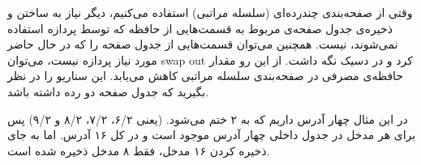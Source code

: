 وقتی از صفحه‌بندی چندرده‌ای (سلسله مراتبی) استفاده می‌کنیم، دیگر نیاز به ساختن و ذخیره‌ی جدول صفحه‌ی مربوط به قسمت‌هایی از حافظه که توسط پردازه استفاده نمی‌شوند، نیست. همچنین می‌توان قسمت‌هایی از جدول صفحه را که در حال حاضر مورد نیاز پردازه نیست، می‌توان swap out کرد و در دسیک نگه داشت. از این رو مقدار حافظه‌ی مصرفی در صفحه‌بندی سلسله مراتبی کاهش می‌یابد.
این سناریو را در نظر بگیرید که جدول صفحه دو رده داشته باشد. 
\begin{latin}
	
\end{latin}

در این مثال چهار آدرس داریم که به ۲ ختم می‌شود. (یعنی ۶/۲، ۷/۲، ۸/۲ و ۹/۲) پس برای هر مدخل در جدول داخلی چهار آدرس موجود است و در کل ۱۶ آدرس. اما به جای ذخیره کردن ۱۶ مدخل، فقط ۸ مدخل ذخیره شده است.